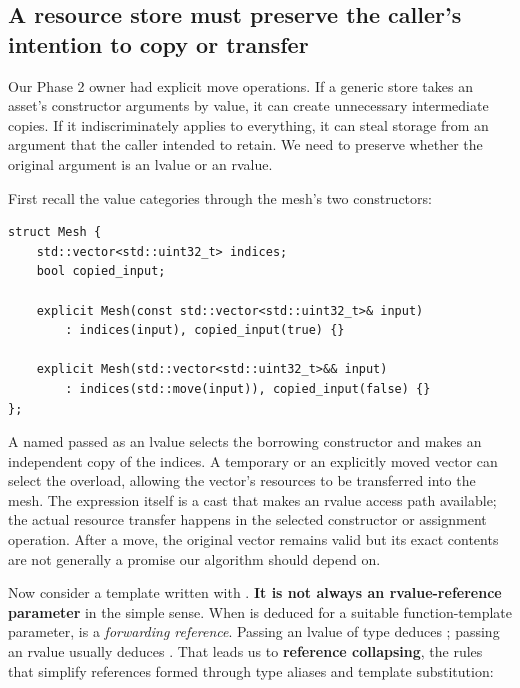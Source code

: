 \subsection{A resource store must preserve the caller's intention to copy or transfer}\label{01-foundations-i-ch005-a-resource-store-must-preserve-the-callers-intention-to-copy-or-transfer}

\hypertarget{01-foundations-i-ch005-a-resource-store-must-preserve-the-callers-intention-to-copy-or-transfer}{}

Our Phase 2 owner had explicit move operations. If a generic store takes an asset's constructor arguments by value, it can create unnecessary intermediate copies. If it indiscriminately applies  to everything, it can steal storage from an argument that the caller intended to retain. We need to preserve whether the original argument is an lvalue or an rvalue.

First recall the value categories through the mesh's two constructors:

\begin{verbatim}
struct Mesh {
    std::vector<std::uint32_t> indices;
    bool copied_input;

    explicit Mesh(const std::vector<std::uint32_t>& input)
        : indices(input), copied_input(true) {}

    explicit Mesh(std::vector<std::uint32_t>&& input)
        : indices(std::move(input)), copied_input(false) {}
};
\end{verbatim}

A named  passed as an lvalue selects the borrowing  constructor and makes an independent copy of the indices. A temporary or an explicitly moved vector can select the \BookInlineCode{\&\&} overload, allowing the vector's resources to be transferred into the mesh. The  expression itself is a cast that makes an rvalue access path available; the actual resource transfer happens in the selected constructor or assignment operation. After a move, the original vector remains valid but its exact contents are not generally a promise our algorithm should depend on.

Now consider a template written with . \textbf{It is not always an rvalue-reference parameter} in the simple sense. When  is deduced for a suitable function-template parameter,  is a \emph{forwarding reference}. Passing an lvalue of type  deduces ; passing an rvalue usually deduces . That leads us to \textbf{reference collapsing}, the rules that simplify references formed through type aliases and template substitution:

